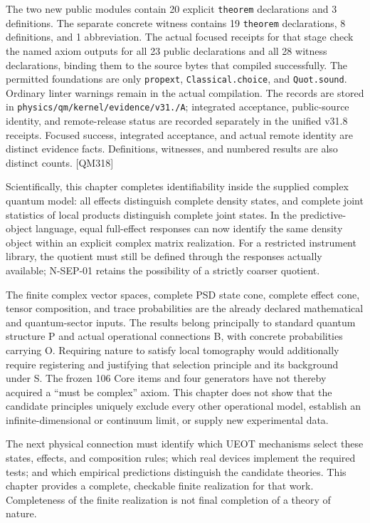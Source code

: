 \documentclass[
  11pt,
  oneside]{book}
\begin{document}
The two new public modules contain 20 explicit \texttt{theorem}
declarations and 3 definitions. The separate concrete witness contains
19 \texttt{theorem} declarations, 8 definitions, and 1 abbreviation. The
actual focused receipts for that stage check the named axiom outputs for
all 23 public declarations and all 28 witness declarations, binding them
to the source bytes that compiled successfully. The permitted
foundations are only \texttt{propext}, \texttt{Classical.\allowbreak choice}, and
\texttt{Quot.\allowbreak sound}. Ordinary linter warnings remain in the actual
compilation. The records are stored in
\texttt{physics/\allowbreak qm/\allowbreak kernel/\allowbreak evidence/\allowbreak v31./\allowbreak A}; integrated acceptance,
public-source identity, and remote-release status are recorded
separately in the unified v31.8 receipts. Focused success, integrated
acceptance, and actual remote identity are distinct evidence facts.
Definitions, witnesses, and numbered results are also distinct counts.
{[}QM318{]}

Scientifically, this chapter completes identifiability inside the
supplied complex quantum model: all effects distinguish complete density
states, and complete joint statistics of local products distinguish
complete joint states. In the predictive-object language, equal
full-effect responses can now identify the same density object within an
explicit complex matrix realization. For a restricted instrument
library, the quotient must still be defined through the responses
actually available; N-SEP-01 retains the possibility of a strictly
coarser quotient.

The finite complex vector spaces, complete PSD state cone, complete
effect cone, tensor composition, and trace probabilities are the already
declared mathematical and quantum-sector inputs. The results belong
principally to standard quantum structure P and actual operational
connections B, with concrete probabilities carrying O. Requiring nature
to satisfy local tomography would additionally require registering and
justifying that selection principle and its background under S. The
frozen 106 Core items and four generators have not thereby acquired a
``must be complex'' axiom. This chapter does not show that the candidate
principles uniquely exclude every other operational model, establish an
infinite-dimensional or continuum limit, or supply new experimental
data.

The next physical connection must identify which UEOT mechanisms select
these states, effects, and composition rules; which real devices
implement the required tests; and which empirical predictions
distinguish the candidate theories. This chapter provides a complete,
checkable finite realization for that work. Completeness of the finite
realization is not final completion of a theory of nature.
\end{document}
